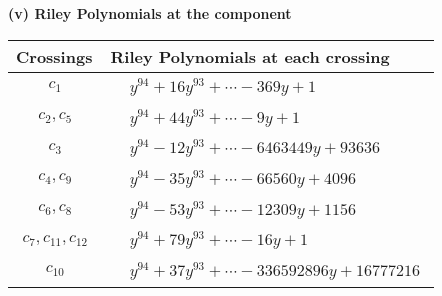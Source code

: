 \documentclass[1p]{elsarticle_modified}
\theoremstyle{definition}
\begin{document}
\newpage\renewcommand{\arraystretch}{1}
\flushleft \textbf{(v) Riley Polynomials at the component}\newline \\
\begin{tabular}{m{50pt}|m{274pt}}
Crossings & \hspace{64pt}Riley Polynomials at each crossing \\
\hline $$\begin{aligned}c_{1}\end{aligned}$$&$\begin{aligned}
&y^{94}+16 y^{93}+\cdots-369 y+1
\end{aligned}$\\
\hline $$\begin{aligned}c_{2},c_{5}\end{aligned}$$&$\begin{aligned}
&y^{94}+44 y^{93}+\cdots-9 y+1
\end{aligned}$\\
\hline $$\begin{aligned}c_{3}\end{aligned}$$&$\begin{aligned}
&y^{94}-12 y^{93}+\cdots-6463449 y+93636
\end{aligned}$\\
\hline $$\begin{aligned}c_{4},c_{9}\end{aligned}$$&$\begin{aligned}
&y^{94}-35 y^{93}+\cdots-66560 y+4096
\end{aligned}$\\
\hline $$\begin{aligned}c_{6},c_{8}\end{aligned}$$&$\begin{aligned}
&y^{94}-53 y^{93}+\cdots-12309 y+1156
\end{aligned}$\\
\hline $$\begin{aligned}c_{7},c_{11},c_{12}\end{aligned}$$&$\begin{aligned}
&y^{94}+79 y^{93}+\cdots-16 y+1
\end{aligned}$\\
\hline $$\begin{aligned}c_{10}\end{aligned}$$&$\begin{aligned}
&y^{94}+37 y^{93}+\cdots-336592896 y+16777216
\end{aligned}$\\
\hline
\end{tabular}\\~\\
\end{document}
